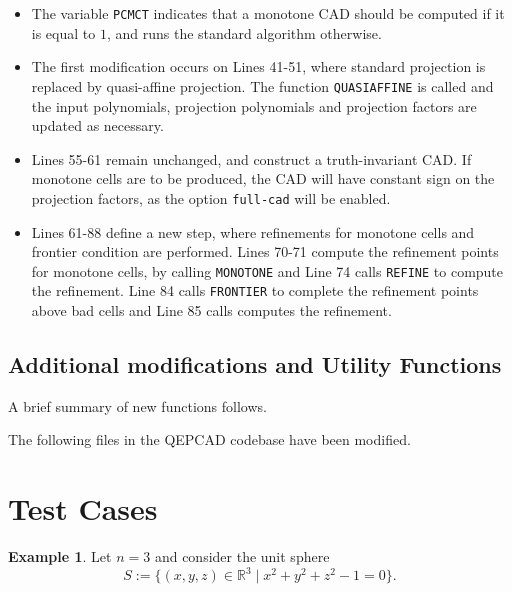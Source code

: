 \documentclass[
]{book}
\providecommand{\tightlist}{%
  \setlength{\itemsep}{0pt}\setlength{\parskip}{0pt}}
\theoremstyle{definition}
\theoremstyle{definition}
\newtheorem{example}{Example}[chapter]
\theoremstyle{definition}
\theoremstyle{definition}
\theoremstyle{remark}
\begin{document}
\begin{itemize}
\tightlist
\item
  The variable \texttt{PCMCT} indicates that a monotone CAD should be computed if it is equal to \(1\), and runs the standard algorithm otherwise.
\item
  The first modification occurs on Lines 41-51, where standard projection is replaced by quasi-affine projection. The function \texttt{QUASIAFFINE} is called and the input polynomials, projection polynomials and projection factors are updated as necessary.
\item
  Lines 55-61 remain unchanged, and construct a truth-invariant CAD. If monotone cells are to be produced, the CAD will have constant sign on the projection factors, as the option \texttt{full-cad} will be enabled.
\item
  Lines 61-88 define a new step, where refinements for monotone cells and frontier condition are performed. Lines 70-71 compute the refinement points for monotone cells, by calling \texttt{MONOTONE} and Line 74 calls \texttt{REFINE} to compute the refinement. Line 84 calls \texttt{FRONTIER} to complete the refinement points above bad cells and Line 85 calls computes the refinement.
\end{itemize}

\hypertarget{additional-modifications-and-utility-functions}{%
\subsection{Additional modifications and Utility Functions}\label{additional-modifications-and-utility-functions}}

A brief summary of new functions follows.

The following files in the QEPCAD codebase have been modified.

\hypertarget{test-cases-1}{%
\section{Test Cases}\label{test-cases-1}}

\begin{example}
\protect\hypertarget{exm:sphere}{}\label{exm:sphere}Let \(n = 3\) and consider the unit sphere
\[
S := \{ (x,y,z) \in \mathbb{R}^3 \mid x^2 + y^2 + z^2 - 1 = 0 \}.
\]
\end{example}
\end{document}
